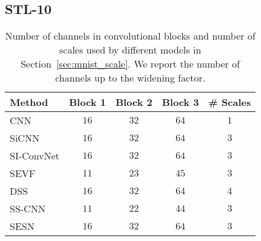 \documentclass{article} \usepackage{multirow}
\def\Secref#1{Section~\ref{#1}}
\begin{document}
\subsection{STL-10}
\begin{table}[h]
    \begin{center}
    \begin{tabular}{l|ccc|c}
    \toprule
    Method                & Block 1 & Block 2 & Block 3 & \# Scales              \\ 
    \midrule
    CNN                   & $16$     & $32$     & $64$    & $1$                                               \\
    SiCNN                 & $16$     & $32$     & $64$   & $3$        \\
    SI-ConvNet                & $16$     & $32$     & $64$    & $3$        \\
SEVF            & $11$     & $23$     & $45$   & $3$     \\
    DSS                   & $16$     & $32$     & $64$   & $4$                   \\
    SS-CNN                & $11$     & $22$     & $44$    & $3$                                                \\
    SESN                  & $16$     & $32$     & $64$    & $3$                                              \\       
    \bottomrule                             
    \end{tabular}
    \end{center}
    \caption{Number of channels in convolutional blocks 
    and number of scales used by different models in \Secref{sec:mnist_scale}. 
    We report the number of channels up to the widening factor.}
    \label{tab:appendix_arch_mnist}
\end{table} 
\end{document}
